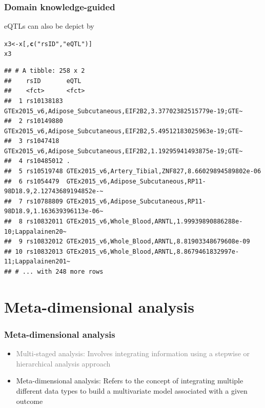 \documentclass[10pt,xcolor=dvipsnames]{beamer}\usepackage[]{graphicx}\usepackage[]{color}
\makeatletter
\newcommand{\hlstr}[1]{\textcolor[rgb]{0.192,0.494,0.8}{#1}}%
\newcommand{\hlstd}[1]{\textcolor[rgb]{0.345,0.345,0.345}{#1}}%
\newcommand{\hlkwb}[1]{\textcolor[rgb]{0.69,0.353,0.396}{#1}}%
\newcommand{\hlkwd}[1]{\textcolor[rgb]{0.737,0.353,0.396}{\textbf{#1}}}%
\newenvironment{kframe}{%
 \def\at@end@of@kframe{}%
 \ifinner\ifhmode%
  \def\at@end@of@kframe{\end{minipage}}%
  \begin{minipage}{\columnwidth}%
 \fi\fi%
 \def\FrameCommand##1{\hskip\@totalleftmargin \hskip-\fboxsep
 \colorbox{shadecolor}{##1}\hskip-\fboxsep
     \hskip-\linewidth \hskip-\@totalleftmargin \hskip\columnwidth}%
 \MakeFramed {\advance\hsize-\width
   \@totalleftmargin\z@ \linewidth\hsize
   \@setminipage}}%
 {\par\unskip\endMakeFramed%
 \at@end@of@kframe}
\newenvironment{knitrout}{}{} %
\makeatother
\begin{document}
\begin{frame}[fragile]\frametitle{Domain knowledge-guided}

eQTLs can also be depict by

\begin{knitrout}\footnotesize
{}\color{fgcolor}\begin{kframe}
\begin{alltt}
\hlstd{x3} \hlkwb{<-} \hlstd{x[,} \hlkwd{c}\hlstd{(}\hlstr{"rsID"}\hlstd{,} \hlstr{"eQTL"}\hlstd{)]}
\hlstd{x3}
\end{alltt}
\begin{verbatim}
## # A tibble: 258 x 2
##    rsID       eQTL                                                             
##    <fct>      <fct>                                                            
##  1 rs10138183 GTEx2015_v6,Adipose_Subcutaneous,EIF2B2,3.37702382515779e-19;GTE~
##  2 rs10149880 GTEx2015_v6,Adipose_Subcutaneous,EIF2B2,5.49512183025963e-19;GTE~
##  3 rs1047418  GTEx2015_v6,Adipose_Subcutaneous,EIF2B2,1.19295941493875e-19;GTE~
##  4 rs10485012 .                                                                
##  5 rs10519748 GTEx2015_v6,Artery_Tibial,ZNF827,8.66029894589802e-06            
##  6 rs1054479  GTEx2015_v6,Adipose_Subcutaneous,RP11-98D18.9,2.12743689194852e-~
##  7 rs10788809 GTEx2015_v6,Adipose_Subcutaneous,RP11-98D18.9,1.163639396113e-06~
##  8 rs10832011 GTEx2015_v6,Whole_Blood,ARNTL,1.99939890886288e-10;Lappalainen20~
##  9 rs10832012 GTEx2015_v6,Whole_Blood,ARNTL,8.81903348679608e-09               
## 10 rs10832013 GTEx2015_v6,Whole_Blood,ARNTL,8.8679461832997e-11;Lappalainen201~
## # ... with 248 more rows
\end{verbatim}
\end{kframe}
\end{knitrout}


\end{frame}




\section{Meta-dimensional analysis}



\begin{frame}\frametitle{Meta-dimensional analysis}

\begin{itemize}
\item \textcolor{Gray}{Multi-staged analysis: Involves integrating information using a stepwise or hierarchical analysis approach}
\item \textcolor{OliveGreen}{Meta-dimensional analysis}: Refers to the concept of integrating multiple different data types to build a multivariate model associated with a given outcome
\end{itemize}
\end{frame}
\end{document}
